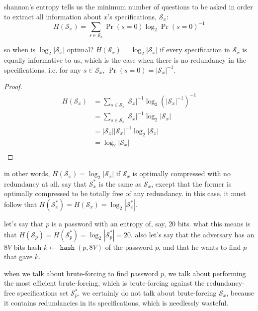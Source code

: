 \documentclass[twocolumn]{article}
\DeclareMathOperator{\hash}{\mathtt{hash}}
\begin{document}
shannon's entropy tells us the minimum number of questions to be asked in
order to extract all information about $x$'s specifications,
$\mathcal{S}_x$:
\begin{equation}
    H(\mathcal{S}_x) = \sum_{s \in \mathcal{S}_x}
        \Pr(s=0) \log_2 \Pr(s=0)^{-1}
\end{equation}

so when is $\log_2 |\mathcal{S}_x|$ optimal?  $H(\mathcal{S}_x) = \log_2
|\mathcal{S}_x|$ if every specification in $\mathcal{S}_x$ is equally
informative to us, which is the case when there is no redundancy in the
specifications.  i.e.  for any $s \in \mathcal{S}_x$, $\Pr(s=0) =
|\mathcal{S}_x|^{-1}$.
\begin{proof}
\begin{equation}
\begin{split}
    H(\mathcal{S}_x)
    &= \sum_{s \in \mathcal{S}_x} |\mathcal{S}_x|^{-1} \log_2
        (|\mathcal{S}_x|^{-1})^{-1} \\
    &= \sum_{s \in \mathcal{S}_x} |\mathcal{S}_x|^{-1} \log_2
        |\mathcal{S}_x| \\
    &= |\mathcal{S}_x| |\mathcal{S}_x|^{-1} \log_2 |\mathcal{S}_x| \\
    &= \log_2 |\mathcal{S}_x| \\
\end{split}
\end{equation}
\end{proof}

in other words, $H(\mathcal{S}_x) = \log_2 |\mathcal{S}_x|$ if
$\mathcal{S}_x$ is optimally compressed with no redundancy at all.  say
that $\mathcal{S}_x^*$ is the same as $\mathcal{S}_x$, except that the
former is optimally compressed to be totally free of any redundancy.  in
this case, it must follow that $H(\mathcal{S}_x^*) = H(\mathcal{S}_x) =
\log_2 |\mathcal{S}_x^*|$.

let's say that $p$ is a password with an entropy of, say, $20$ bits.  what
this means is that $H(\mathcal{S}_p) = H(\mathcal{S}_p^*) = \log_2
|\mathcal{S}_p^*| = 20$.  also let's say that the adversary has an $8V$
bits hash $k \gets \hash(p, 8V)$ of the password $p$, and that he wants to
find $p$ that gave $k$.

when we talk about brute-forcing to find password $p$, we talk about
performing the most efficient brute-forcing, which is brute-forcing against
the redundancy-free specifications set $\mathcal{S}_p^*$.  we certainly do
not talk about brute-forcing $\mathcal{S}_x$, because it contains
redundancies in its specifications, which is needlessly wasteful.
\end{document}
